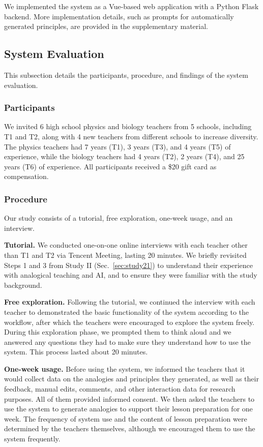 We implemented the system as a Vue-based web application with a Python Flask backend. More implementation details, such as prompts for automatically generated principles, are provided in the supplementary material.


\subsection{System Evaluation}
This subsection details the participants, procedure, and findings of the system evaluation.
\subsubsection{Participants}
We invited 6 high school physics and biology teachers from 5 schools, including T1 and T2, along with 4 new teachers from different schools to increase diversity. 
The physics teachers had 7 years (T1), 3 years (T3), and 4 years (T5) of experience, while the biology teachers had 4 years (T2), 2 years (T4), and 25 years (T6) of experience. All participants received a \$20 gift card as compensation.

\subsubsection{Procedure}
Our study consists of a tutorial, free exploration, one-week usage, and an interview.

\textbf{Tutorial.} We conducted one-on-one online interviews with each teacher other than T1 and T2 via Tencent Meeting, lasting 20 minutes. 
We briefly revisited Steps 1 and 3 from Study II (Sec.~\ref{sec:study21}) to understand their experience with analogical teaching and AI, and to ensure they were familiar with the study background.

\textbf{Free exploration.} Following the tutorial, we continued the interview with each teacher to demonstrated the basic functionality of the system according to the workflow, after which the teachers were encouraged to explore the system freely. 
During this exploration phase, we prompted them to think aloud and we answered any questions they had to make sure they understand how to use the system. 
This process lasted about 20 minutes. 

\textbf{One-week usage.} Before using the system, we informed the teachers that it would collect data on the analogies and principles they generated, as well as their feedback, manual edits, comments, and other interaction data for research purposes. 
All of them provided informed consent. 
We then asked the teachers to use the system to generate analogies to support their lesson preparation for one week.
The frequency of system use and the content of lesson preparation were determined by the teachers themselves, although we encouraged them to use the system frequently.


